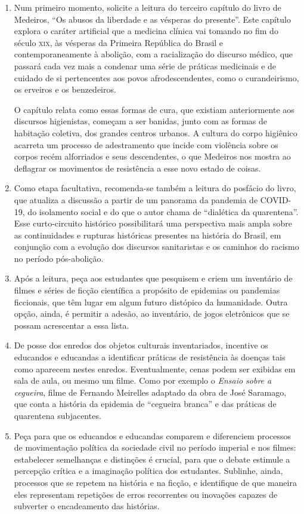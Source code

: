 \documentclass[12pt]{extarticle}
\begin{document}
\begin{enumerate}
\item Num primeiro momento, solicite a leitura do terceiro capítulo do livro
de Medeiros, ``Os abusos da liberdade e as vésperas do presente''. Este
capítulo explora o caráter artificial que a medicina clínica vai tomando
no fim do século \textsc{xix}, às vésperas da Primeira República do Brasil e
contemporaneamente à abolição, com a racialização do discurso médico,
que passará cada vez mais a condenar uma série de práticas medicinais e
de cuidado de si pertencentes aos povos afrodescendentes, como o
curandeirismo, os erveiros e os benzedeiros.

O capítulo relata como essas formas de cura, que existiam anteriormente
aos discursos higienistas, começam a ser banidas, junto com as formas de
habitação coletiva, dos grandes centros urbanos. A cultura do corpo
higiênico acarreta um processo de adestramento que incide com violência
sobre os corpos recém alforriados e seus descendentes, o que Medeiros
nos mostra ao deflagrar os movimentos de resistência a esse novo estado
de coisas.

\item Como etapa facultativa, recomenda-se também a leitura do posfácio do
livro, que atualiza a discussão a partir de um panorama da pandemia de
COVID-19, do isolamento social e do que o autor chama de ``dialética da
quarentena''. Esse curto-circuito histórico possibilitará uma
perspectiva mais ampla sobre as continuidades e rupturas históricas
presentes na história do Brasil, em conjunção com a evolução dos
discursos sanitaristas e os caminhos do racismo no período pós-abolição.

\item Após a leitura, peça aos estudantes que pesquisem e criem um inventário
de filmes e séries de ficção científica a propósito de epidemias ou
pandemias ficcionais, que têm lugar em algum futuro distópico da
humanidade. Outra opção, ainda, é permitir a adesão, ao inventário, de
jogos eletrônicos que se possam acrescentar a essa lista.

\item De posse dos enredos dos objetos culturais inventariados, incentive os
educandos e educandas a identificar práticas de resistência às doenças
tais como aparecem nestes enredos. Eventualmente, cenas podem ser
exibidas em sala de aula, ou mesmo um filme. Como por exemplo o
\emph{Ensaio sobre a cegueira}, filme de Fernando Meirelles adaptado da
obra de José Saramago, que conta a história da epidemia de ``cegueira
branca'' e das práticas de quarentena subjacentes.

\item Peça para que os educandos e educandas comparem e diferenciem processos
de movimentação política da sociedade civil no período imperial e nos
filmes: estabelecer semelhanças e distinções é crucial, para que o
debate estimule a percepção crítica e a imaginação política dos
estudantes. Sublinhe, ainda, processos que se repetem na história e na
ficção, e identifique de que maneira eles representam repetições de
erros recorrentes ou inovações capazes de subverter o encadeamento das
histórias.
\end{enumerate}
\end{document}
